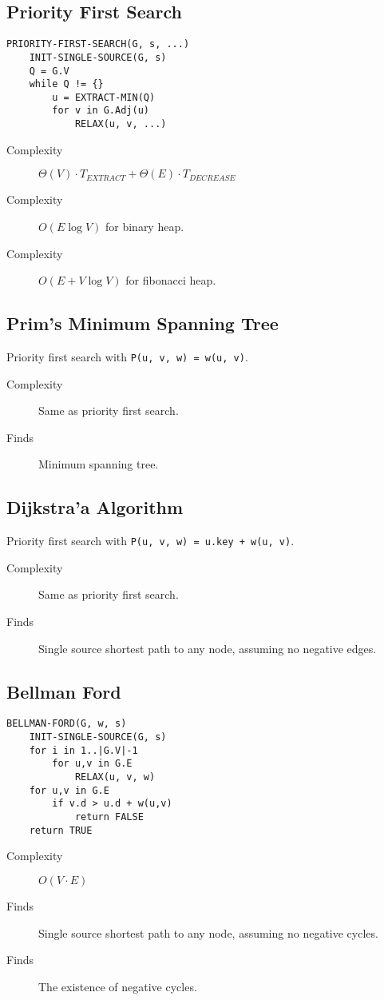 \documentclass[landscape]{cheat}
\begin{document}
\begin{multicols*}{3}
\subsection{Priority First Search}
\begin{lstlisting}
PRIORITY-FIRST-SEARCH(G, s, ...)
    INIT-SINGLE-SOURCE(G, s)
    Q = G.V
    while Q != {}
        u = EXTRACT-MIN(Q)
        for v in G.Adj(u)
            RELAX(u, v, ...)
\end{lstlisting}
\begin{description}
    \item[Complexity] $\Theta(V)\cdot T_{EXTRACT} + \Theta(E)\cdot T_{DECREASE}$
    \item[Complexity] $O(E\log{V})$ for binary heap.
    \item[Complexity] $O(E+V\log{V})$ for fibonacci heap.
\end{description}

\subsection{Prim's Minimum Spanning Tree}
Priority first search with
\lstinline{P(u, v, w) = w(u, v)}.
\begin{description}
    \item[Complexity] Same as priority first search.
    \item[Finds] Minimum spanning tree.
\end{description}

\subsection{Dijkstra'a Algorithm}
Priority first search with \lstinline{P(u, v, w) = u.key + w(u, v)}.
\begin{description}
    \item[Complexity] Same as priority first search.
    \item[Finds] Single source shortest path to any node, assuming no negative edges.
\end{description}

\subsection{Bellman Ford}
\begin{lstlisting}
BELLMAN-FORD(G, w, s)
    INIT-SINGLE-SOURCE(G, s)
    for i in 1..|G.V|-1
        for u,v in G.E
            RELAX(u, v, w)
    for u,v in G.E
        if v.d > u.d + w(u,v)
            return FALSE
    return TRUE
\end{lstlisting}
\begin{description}
    \item[Complexity] $O(V\cdot E)$
    \item[Finds] Single source shortest path to any node, assuming no negative cycles.
    \item[Finds] The existence of negative cycles.
\end{description}


\end{multicols*}
\end{document}
